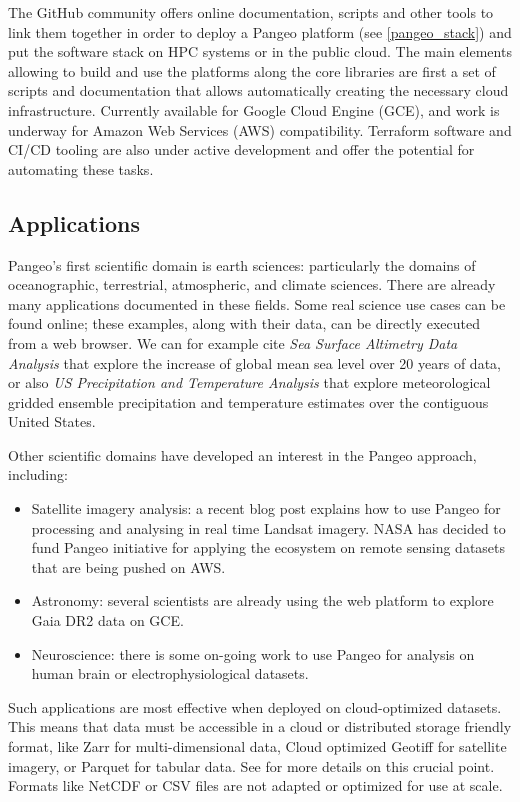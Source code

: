 \documentclass{article}
\begin{document}
The GitHub community offers online documentation, scripts and other tools to link them together in order to deploy a Pangeo platform (see \ref{pangeo_stack}) and put the software stack on HPC systems or in the public cloud. The main elements allowing to build and use the platforms along the core libraries are first a set of scripts and documentation that allows automatically creating the necessary cloud infrastructure. Currently available for Google Cloud Engine (GCE), and work is underway for Amazon Web Services (AWS) compatibility. Terraform software and CI/CD tooling are also under active development and offer the potential for automating these tasks.


\subsection{Applications}
\label{ssec:applications}

Pangeo's first scientific domain is earth sciences: particularly the domains of oceanographic, terrestrial, atmospheric, and climate sciences. There are already many applications documented in these fields. Some real science use cases can be found online\cite{b5}; these examples, along with their data, can be directly executed from a web browser. We can for example cite \textit{Sea Surface Altimetry Data Analysis} that explore the increase of global mean sea level over 20 years of data, or also \textit{US Precipitation and Temperature Analysis} that explore meteorological gridded ensemble precipitation and temperature estimates over the contiguous United States.

Other scientific domains have developed an interest in the Pangeo approach, including:
\begin{itemize}
\item Satellite imagery analysis: a recent blog post\cite{b6} explains how to use Pangeo for processing and analysing in real time Landsat imagery. NASA has decided to fund Pangeo initiative for applying the ecosystem on remote sensing datasets that are being pushed on AWS.
\item Astronomy: several scientists are already using the web platform to explore Gaia DR2 data on GCE.
\item Neuroscience: there is some on-going work to use Pangeo for analysis on human brain or electrophysiological datasets.
\end{itemize}

Such applications are most effective when deployed on cloud-optimized datasets. This means that data must be accessible in a cloud or distributed storage friendly format, like Zarr for multi-dimensional data, Cloud optimized Geotiff for satellite imagery, or Parquet for tabular data. See \cite{b7} for more details on this crucial point. Formats like NetCDF or CSV files are not adapted or optimized for use at scale.
\end{document}
